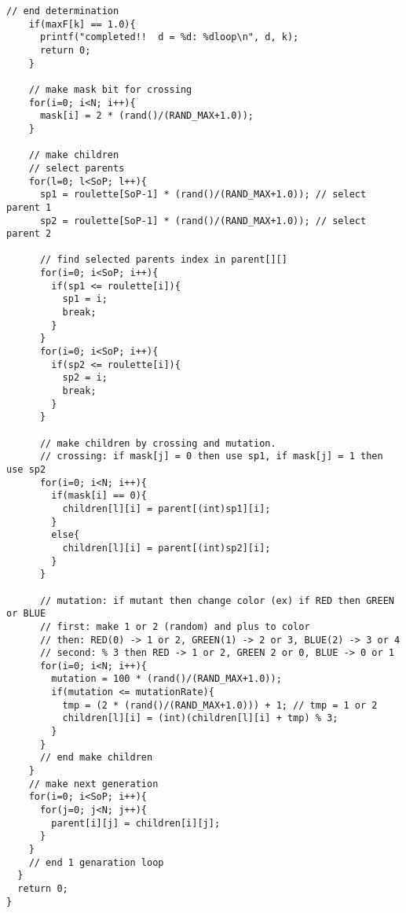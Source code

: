 \documentclass[a4j]{jarticle}
\begin{document}
\begin{lstlisting}[caption=GA.c, label=GA.c, xleftmargin=1cm]
    // end determination
    if(maxF[k] == 1.0){
      printf("completed!!  d = %d: %dloop\n", d, k);
      return 0;
    }

    // make mask bit for crossing
    for(i=0; i<N; i++){
      mask[i] = 2 * (rand()/(RAND_MAX+1.0));
    }
    
    // make children
    // select parents
    for(l=0; l<SoP; l++){
      sp1 = roulette[SoP-1] * (rand()/(RAND_MAX+1.0)); // select parent 1
      sp2 = roulette[SoP-1] * (rand()/(RAND_MAX+1.0)); // select parent 2

      // find selected parents index in parent[][]
      for(i=0; i<SoP; i++){
        if(sp1 <= roulette[i]){
          sp1 = i;
          break;
        }
      }
      for(i=0; i<SoP; i++){
        if(sp2 <= roulette[i]){
          sp2 = i;
          break;
        }
      }

      // make children by crossing and mutation.
      // crossing: if mask[j] = 0 then use sp1, if mask[j] = 1 then use sp2
      for(i=0; i<N; i++){
        if(mask[i] == 0){
          children[l][i] = parent[(int)sp1][i];
        }
        else{
          children[l][i] = parent[(int)sp2][i];
        }
      }

      // mutation: if mutant then change color (ex) if RED then GREEN or BLUE
      // first: make 1 or 2 (random) and plus to color
      // then: RED(0) -> 1 or 2, GREEN(1) -> 2 or 3, BLUE(2) -> 3 or 4
      // second: % 3 then RED -> 1 or 2, GREEN 2 or 0, BLUE -> 0 or 1
      for(i=0; i<N; i++){
        mutation = 100 * (rand()/(RAND_MAX+1.0));
        if(mutation <= mutationRate){
          tmp = (2 * (rand()/(RAND_MAX+1.0))) + 1; // tmp = 1 or 2
          children[l][i] = (int)(children[l][i] + tmp) % 3;
        }
      }
      // end make children
    }
    // make next generation
    for(i=0; i<SoP; i++){
      for(j=0; j<N; j++){
        parent[i][j] = children[i][j];
      }
    }
    // end 1 genaration loop
  }
  return 0;
}

\end{lstlisting}
\end{document}
